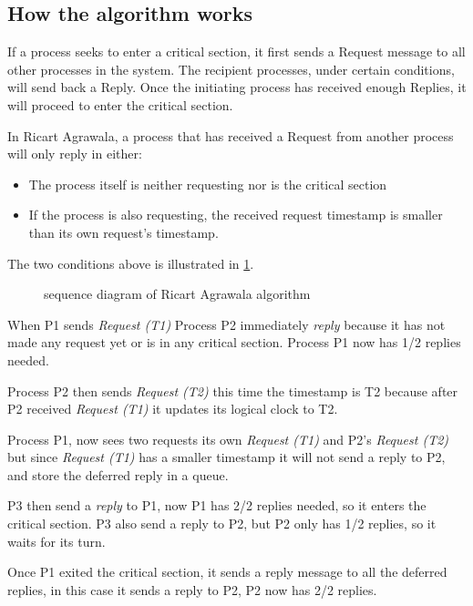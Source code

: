 \subsection{How the algorithm works}

If a process seeks to enter a critical section, it first sends a Request message
to all other processes in the system. The recipient processes, under certain
conditions, will send back a Reply. Once the initiating process has received
enough Replies, it will proceed to enter the critical section.

In Ricart Agrawala, a process that has received a Request from another process will only 
reply in either:

\begin{itemize}
  \item The process itself is neither requesting nor is the critical section
  \item If the process is also requesting, the received request timestamp is smaller than its own request's timestamp.
\end{itemize}

The two conditions above is illustrated in \ref{fig:ricart_agrawala_seq}.

\begin{figure}[htbp]
  \centering
  
  \caption{sequence diagram of Ricart Agrawala algorithm}
  \label{fig:ricart_agrawala_seq}
\end{figure}

When P1 sends \textit{Request (T1)} Process P2 immediately \textit{reply} because it has not made any request yet 
or is in any critical section. Process P1 now has 1/2 replies needed.

Process P2 then sends \textit{Request (T2)} this time the timestamp is T2 because after P2 received 
\textit{Request (T1)} it updates its logical clock to T2. 

Process P1, now sees two requests its own \textit{Request (T1)} and P2's \textit{Request (T2)}
but since \textit{Request (T1)} has a smaller timestamp it will not send a reply to P2, and store
the deferred reply in a queue.

P3 then send a \textit{reply} to P1, now P1 has 2/2 replies needed, so it enters the critical 
section. P3 also send a reply to P2, but P2 only has 1/2 replies, so it waits for its turn.

Once P1 exited the critical section, it sends a reply message to all the deferred replies,
in this case it sends a reply to P2, P2 now has 2/2 replies. 

